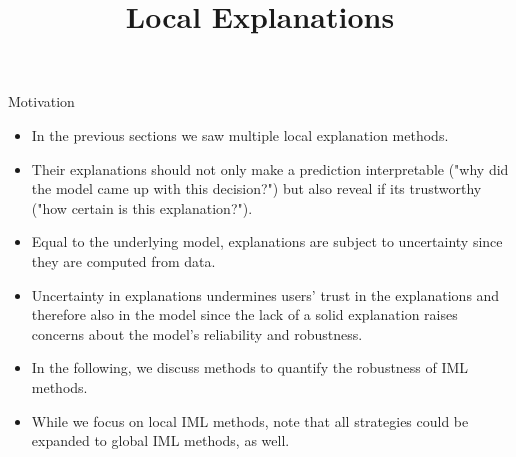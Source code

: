 \documentclass[11pt,compress,t,notes=noshow, xcolor=table]{beamer}
\title{Local Explanations}
\institute{\href{https://compstat-lmu.github.io/lecture_i2ml/}{compstat-lmu.github.io/lecture\_i2ml}}
\date{}
\begin{document}
	










\begin{vbframe}{Motivation}
	\begin{itemize}
		\item In the previous sections we saw multiple local explanation methods. 
		\item Their explanations should not only make a prediction interpretable ("why did the model came up with this decision?") but also reveal if its trustworthy ("how certain is this explanation?").
		\item Equal to the underlying model, explanations are subject to uncertainty since they are computed from data. 
		\item Uncertainty in explanations undermines users' trust in the explanations and therefore also in the model since the lack of a solid explanation raises concerns about the model's reliability and robustness. 
		\item In the following, we discuss methods to quantify the robustness of IML methods.
		\item While we focus on local IML methods, note that all strategies could be expanded to global IML methods, as well.
	\end{itemize}
\end{vbframe}
\end{document}
